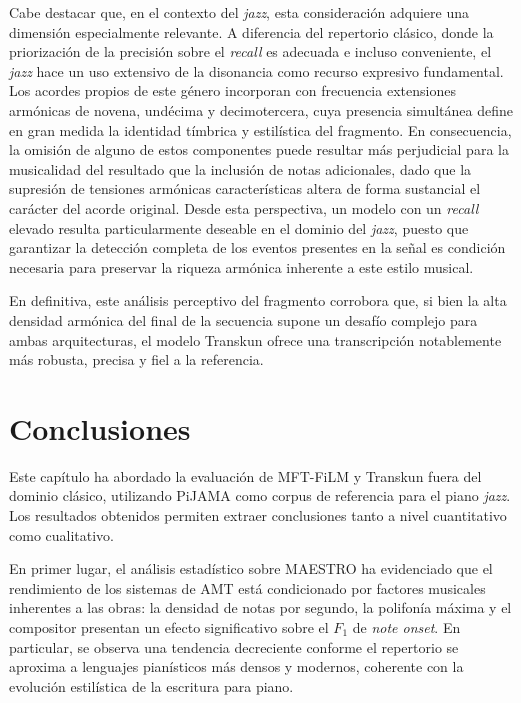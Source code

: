 \documentclass[11pt,spanish,listoffigures,listoftables]{tfgetsinf}
\begin{document}
Cabe destacar que, en el contexto del \textit{jazz}, esta consideración adquiere una dimensión especialmente relevante. A
diferencia del repertorio clásico, donde la priorización de la precisión sobre el \textit{recall} es adecuada e incluso conveniente,
el \textit{jazz} hace un uso extensivo de la disonancia como recurso expresivo fundamental. Los acordes propios de este género incorporan
con frecuencia extensiones armónicas de novena, undécima y decimotercera, cuya presencia simultánea define en gran medida la identidad
tímbrica y estilística del fragmento. En consecuencia, la omisión de alguno de estos componentes puede resultar más perjudicial para la
musicalidad del resultado que la inclusión de notas adicionales, dado que la supresión de tensiones armónicas características altera de
forma sustancial el carácter del acorde original. Desde esta perspectiva, un modelo con un \textit{recall} elevado resulta particularmente
deseable en el dominio del \textit{jazz}, puesto que garantizar la detección completa de los eventos presentes en la señal es condición necesaria para
preservar la riqueza armónica inherente a este estilo musical.

En definitiva, este análisis perceptivo del fragmento corrobora que, si bien la alta densidad armónica del final de la
secuencia supone un desafío complejo para ambas arquitecturas, el modelo Transkun ofrece una transcripción notablemente más robusta,
precisa y fiel a la referencia.


\section{Conclusiones}
\label{sec:conclusiones_pijama}

Este capítulo ha abordado la evaluación de MFT-FiLM y Transkun fuera del dominio
clásico, utilizando PiJAMA como corpus de referencia para el piano \textit{jazz}. Los resultados
obtenidos permiten extraer conclusiones tanto a nivel cuantitativo como cualitativo.

En primer lugar, el análisis estadístico sobre MAESTRO ha evidenciado que el rendimiento
de los sistemas de AMT está condicionado por factores musicales inherentes a las obras:
la densidad de notas por segundo, la polifonía máxima y el compositor presentan un
efecto significativo sobre el $F_1$ de \textit{note onset}. En particular, se observa una tendencia
decreciente conforme el repertorio se aproxima a lenguajes pianísticos más densos y
modernos, coherente con la evolución estilística de la escritura para piano.
\end{document}
